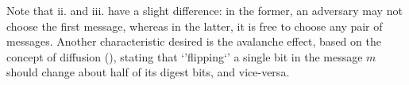 Note that ii. and iii. have a slight difference: in the former, an adversary
may not choose the first message, whereas in the latter, it is free to choose
any pair of messages. Another characteristic desired is the avalanche effect,
based on the concept of diffusion (\cite{Stallings:2010:CNS:1824151}), stating
that `'flipping`' a single bit in the message $m$ should change about half of
its digest bits, and vice-versa.